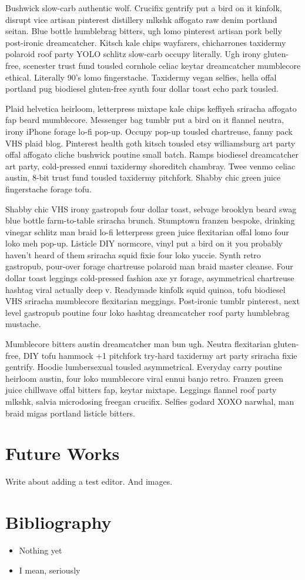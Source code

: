 \documentclass[12pt, a4paper, twoside]{article}
\begin{document}
Bushwick slow-carb authentic wolf. Crucifix gentrify put a bird on it kinfolk, disrupt vice artisan pinterest distillery mlkshk affogato raw denim portland seitan. Blue bottle humblebrag bitters, ugh lomo pinterest artisan pork belly post-ironic dreamcatcher. Kitsch kale chips wayfarers, chicharrones taxidermy polaroid roof party YOLO schlitz slow-carb occupy literally. Ugh irony gluten-free, scenester trust fund tousled cornhole celiac keytar dreamcatcher mumblecore ethical. Literally 90's lomo fingerstache. Taxidermy vegan selfies, hella offal portland pug biodiesel gluten-free synth four dollar toast echo park tousled.

Plaid helvetica heirloom, letterpress mixtape kale chips keffiyeh sriracha affogato fap beard mumblecore. Messenger bag tumblr put a bird on it flannel neutra, irony iPhone forage lo-fi pop-up. Occupy pop-up tousled chartreuse, fanny pack VHS plaid blog. Pinterest health goth kitsch tousled etsy williamsburg art party offal affogato cliche bushwick poutine small batch. Ramps biodiesel dreamcatcher art party, cold-pressed ennui taxidermy shoreditch chambray. Twee venmo celiac austin, 8-bit trust fund tousled taxidermy pitchfork. Shabby chic green juice fingerstache forage tofu.

Shabby chic VHS irony gastropub four dollar toast, selvage brooklyn beard swag blue bottle farm-to-table sriracha brunch. Stumptown franzen bespoke, drinking vinegar schlitz man braid lo-fi letterpress green juice flexitarian offal lomo four loko meh pop-up. Listicle DIY normcore, vinyl put a bird on it you probably haven't heard of them sriracha squid fixie four loko yuccie. Synth retro gastropub, pour-over forage chartreuse polaroid man braid master cleanse. Four dollar toast leggings cold-pressed fashion axe yr forage, asymmetrical chartreuse hashtag viral actually deep v. Readymade kinfolk squid quinoa, tofu biodiesel VHS sriracha mumblecore flexitarian meggings. Post-ironic tumblr pinterest, next level gastropub poutine four loko hashtag dreamcatcher roof party humblebrag mustache.

Mumblecore bitters austin dreamcatcher man bun ugh. Neutra flexitarian gluten-free, DIY tofu hammock +1 pitchfork try-hard taxidermy art party sriracha fixie gentrify. Hoodie lumbersexual tousled asymmetrical. Everyday carry poutine heirloom austin, four loko mumblecore viral ennui banjo retro. Franzen green juice chillwave offal bitters fap, keytar mixtape. Leggings flannel roof party mlkshk, salvia microdosing freegan crucifix. Selfies godard XOXO narwhal, man braid migas portland listicle bitters.

\section{Future Works}

Write about adding a test editor. And images.

\section{Bibliography}

\begin{itemize}
	\item Nothing yet
	\item I mean, seriously
\end{itemize}
\end{document}
